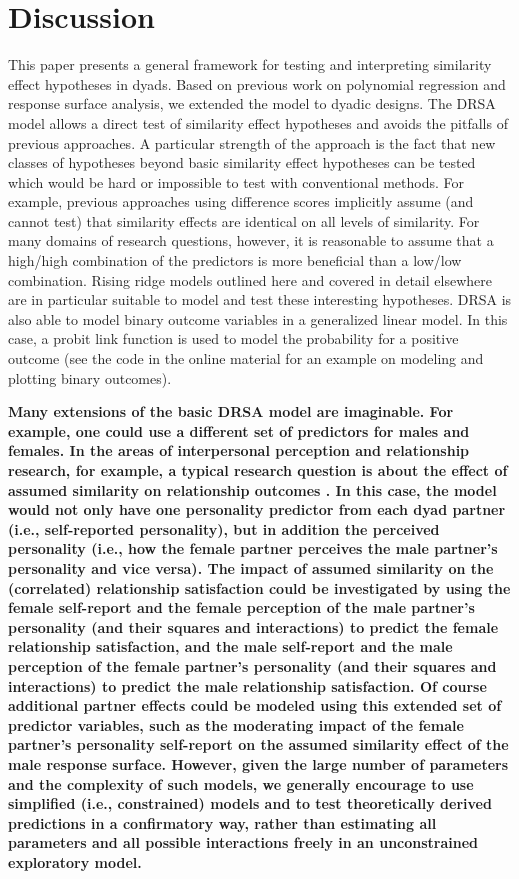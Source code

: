 \documentclass[jou,a4paper,draftfirst]{apa6}
\newcommand{\added}[1]{\textcolor{colour_added}{\bf{#1}}}
\begin{document}
\section{Discussion}
This paper presents a general framework for testing and interpreting similarity effect hypotheses in dyads. Based on previous work on polynomial regression and response surface analysis, we extended the model to dyadic designs. The DRSA model allows a direct test of similarity effect hypotheses and avoids the pitfalls of previous approaches. A particular strength of the approach is the fact that new classes of hypotheses beyond basic similarity effect hypotheses can be tested which would be hard or impossible to test with conventional methods. For example, previous approaches using difference scores implicitly assume (and cannot test) that similarity effects are identical on all levels of similarity. For many domains of research questions, however, it is reasonable to assume that a high/high combination of the predictors is more beneficial than a low/low combination. Rising ridge models outlined here and covered in detail elsewhere \parencite{schonbrodt_testing_2015} are in particular suitable to model and test these interesting hypotheses. DRSA is also able to model binary outcome variables in a generalized linear model. In this case, a probit link function is used to model the probability for a positive outcome (see the code in the online material for an example on modeling and plotting binary outcomes).

\added{Many extensions of the basic DRSA model are imaginable. For example, one could use a different set of predictors for males and females. In the areas of interpersonal perception and relationship research, for example, a typical research question is about the effect of assumed similarity on relationship outcomes \parencite{Back_Vazire_2015}. In this case, the model would not only have one personality predictor from each dyad partner (i.e., self-reported personality), but in addition the perceived personality (i.e., how the female partner perceives the male partner's personality and vice versa). The impact of assumed similarity on the (correlated) relationship satisfaction could be investigated by using the female self-report and the female perception of the male partner's personality (and their squares and interactions) to predict the female relationship satisfaction, and the male self-report and the male perception of the female partner's personality (and their squares and interactions) to predict the male relationship satisfaction. Of course additional partner effects could be modeled using this extended set of predictor variables, such as the moderating impact of the female partner's personality self-report on the assumed similarity effect of the male response surface. However, given the large number of parameters and the complexity of such models, we generally encourage to use simplified (i.e., constrained) models and to test theoretically derived predictions in a confirmatory way, rather than estimating all parameters and all possible interactions freely in an unconstrained exploratory model.}
\end{document}
